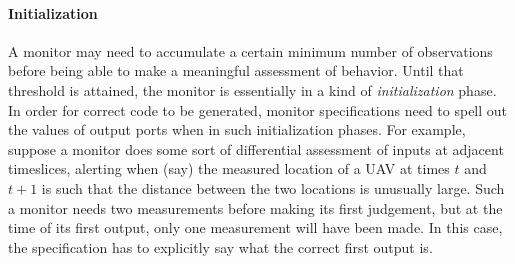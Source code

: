 \paragraph{Initialization}
A monitor may need to accumulate a certain minimum number of
observations before being able to make a meaningful assessment of
behavior. Until that threshold is attained, the monitor is essentially
in a kind of \emph{initialization} phase. In order for correct code to
be generated, monitor specifications need to spell out the values of
output ports when in such initialization phases. For example, suppose
a monitor does some sort of differential assessment of inputs at
adjacent timeslices, alerting when (say) the measured location of a
UAV at times $t$ and $t+1$ is such that the distance between the two
locations is unusually large. Such a monitor needs two measurements
before making its first judgement, but at the time of its first
output, only one measurement will have been made. In this case, the
specification has to explicitly say what the correct first output is.
